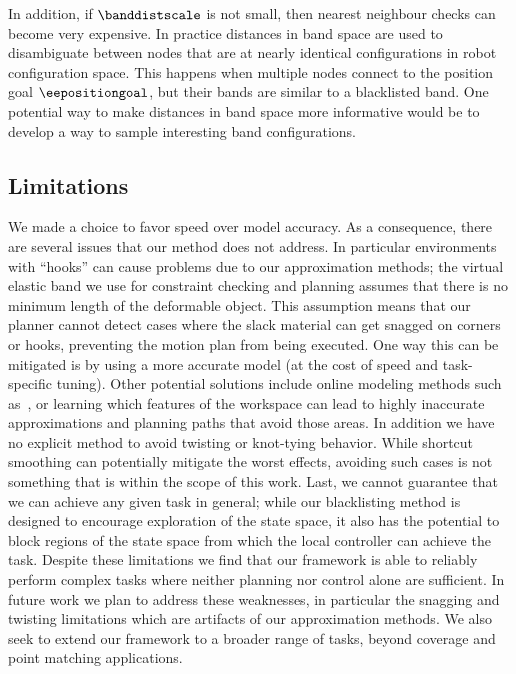In addition, if $\banddistscale$ is not small, then nearest neighbour checks can become very expensive. In practice distances in band space are used to disambiguate between nodes that are at nearly identical configurations in robot configuration space. This happens when multiple nodes connect to the position goal $\eepositiongoal$, but their bands are similar to a blacklisted band. One potential way to make distances in band space more informative would be to develop a way to sample interesting band configurations.








\subsection{Limitations}
We made a choice to favor speed over model accuracy. As a consequence, there are several issues that our method does not address. In particular environments with ``hooks'' can cause problems due to our approximation methods; the virtual elastic band we use for constraint checking and planning assumes that there is no minimum length of the deformable object. This assumption means that our planner cannot detect cases where the slack material can get snagged on corners or hooks, preventing the motion plan from being executed. One way this can be mitigated is by using a more accurate model (at the cost of speed and task-specific tuning). Other potential solutions include online modeling methods such as~\cite{Hu2018deformable_gpr}, or learning which features of the workspace can lead to highly inaccurate approximations and planning paths that avoid those areas. In addition we have no explicit method to avoid twisting or knot-tying behavior. While shortcut smoothing can potentially mitigate the worst effects, avoiding such cases is not something that is within the scope of this work. Last, we cannot guarantee that we can achieve any given task in general; while our blacklisting method is designed to encourage exploration of the state space, it also has the potential to block regions of the state space from which the local controller can achieve the task. Despite these limitations we find that our framework is able to reliably perform complex tasks where neither planning nor control alone are sufficient. In future work we plan to address these weaknesses, in particular the snagging and twisting limitations which are artifacts of our approximation methods. We also seek to extend our framework to a broader range of tasks, beyond coverage and point matching applications.

